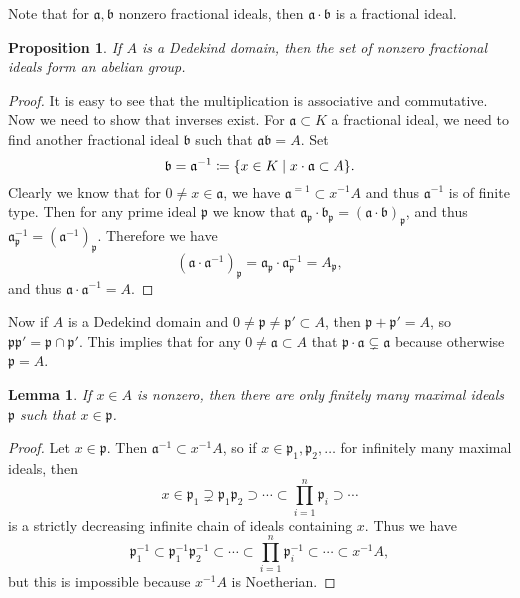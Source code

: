 \documentclass[leqno, openany]{memoir}
\newtheorem{prop}[thm]{Proposition}
\newtheorem{lem}[thm]{Lemma}
\theoremstyle{definition}
\theoremstyle{remark}
\theoremstyle{plain}
\theoremstyle{definition}
\theoremstyle{remark}
\newcommand{\mf}[1]{\mathfrak{#1}}
\begin{document}
Note that for $\mf{a}, \mf{b}$ nonzero fractional ideals, then $\mf{a} \cdot
\mf{b}$ is a fractional ideal.

\begin{prop} If $A$ is a Dedekind domain, then the set of nonzero fractional
ideals form an abelian group.  \end{prop}

\begin{proof} It is easy to see that the multiplication is associative and
    commutative. Now we need to show that inverses exist. For $\mf{a} \subset
    K$ a fractional ideal, we need to find another fractional ideal $\mf{b}$
    such that $\mf{a} \mf{b} = A$. Set \[ \mf{b} = \mf{a}^{-1} \coloneqq \qty{
    x \in K \mid x \cdot \mf{a} \subset A }. \] Clearly we know that for $0
    \neq x \in \mf{a}$, we have $\mf{a}^{=1} \subset x^{-1}A$ and thus
    $\mf{a}^{-1}$ is of finite type. Then for any prime ideal $\mf{p}$ we know
    that $\mf{a}_{\mf{p}} \cdot \mf{b}_{\mf{p}} = (\mf{a \cdot b})_{\mf{p}}$,
    and thus $\mf{a}_{\mf{p}}^{-1} = (\mf{a}^{-1})_{\mf{p}}$. Therefore we have
    \[ (\mf{a} \cdot \mf{a}^{-1})_{\mf{p}} = \mf{a}_{\mf{p}} \cdot
    \mf{a}_{\mf{p}}^{-1} = A_{\mf{p}}, \] and thus $\mf{a} \cdot \mf{a}^{-1} =
A$.  \end{proof}

Now if $A$ is a Dedekind domain and $0 \neq \mf{p} \neq \mf{p}' \subset A$,
then $\mf{p} + \mf{p}' = A$, so $\mf{p} \mf{p}' = \mf{p} \cap \mf{p}'$. This
implies that for any $0 \neq \mf{a} \subset A$ that $\mf{p} \cdot \mf{a}
\subsetneq \mf{a}$ because otherwise $\mf{p} = A$.

\begin{lem} If $x \in A$ is nonzero, then there are only finitely many maximal
ideals $\mf{p}$ such that $x \in \mf{p}$.  \end{lem}

\begin{proof} Let $x \in \mf{p}$. Then $\mf{a}^{-1} \subset x^{-1}A$, so if $x
    \in \mf{p}_1, \mf{p}_2, \ldots$ for infinitely many maximal ideals, then \[
    x \in \mf{p}_1 \supsetneq \mf{p}_1 \mf{p}_2 \supset \cdots \subset
\prod_{i=1}^n \mf{p}_i \supset \cdots \] is a strictly decreasing infinite
chain of ideals containing $x$. Thus we have \[ \mf{p}_1^{-1} \subset
\mf{p}_1^{-1} \mf{p}_2^{-1} \subset \cdots \subset \prod_{i=1}^n \mf{p}_i^{-1}
\subset \cdots \subset  x^{-1} A, \] but this is impossible because $x^{-1}A$
is Noetherian.  \end{proof}
\end{document}
